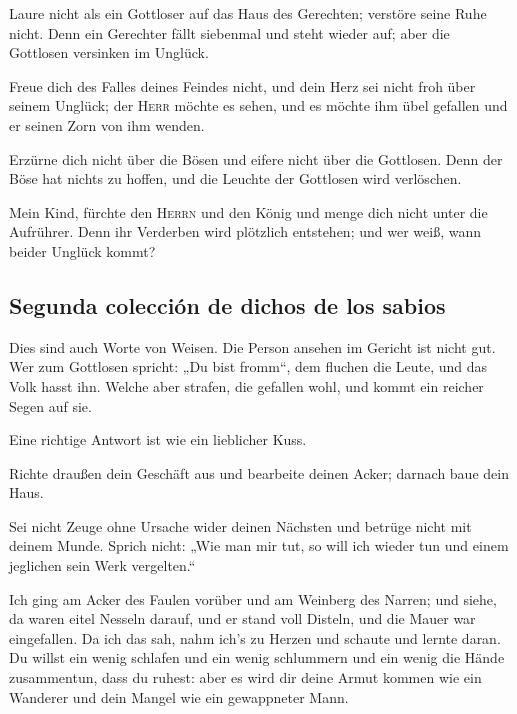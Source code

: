  Laure nicht als ein Gottloser auf das Haus des
Gerechten; verstöre seine Ruhe nicht.  Denn ein Gerechter
fällt siebenmal und steht wieder auf; aber die Gottlosen versinken im
Unglück.

 Freue dich des Falles deines Feindes nicht, und dein
Herz sei nicht froh über seinem Unglück;  der
\textsc{Herr} möchte es sehen, und es möchte ihm übel gefallen und er
seinen Zorn von ihm wenden.

 Erzürne dich nicht über die Bösen und eifere nicht über
die Gottlosen.  Denn der Böse hat nichts zu hoffen, und
die Leuchte der Gottlosen wird verlöschen.

 Mein Kind, fürchte den \textsc{Herrn} und den König und
menge dich nicht unter die Aufrührer.  Denn ihr Verderben
wird plötzlich entstehen; und wer weiß, wann beider Unglück kommt?

\hypertarget{segunda-colecciuxf3n-de-dichos-de-los-sabios}{%
\subsection{Segunda colección de dichos de los
sabios}\label{segunda-colecciuxf3n-de-dichos-de-los-sabios}}

 Dies sind auch Worte von Weisen. Die Person ansehen im
Gericht ist nicht gut.  Wer zum Gottlosen spricht: „Du
bist fromm``, dem fluchen die Leute, und das Volk hasst ihn.
 Welche aber strafen, die gefallen wohl, und kommt ein
reicher Segen auf sie.

 Eine richtige Antwort ist wie ein lieblicher Kuss.

 Richte draußen dein Geschäft aus und bearbeite deinen
Acker; darnach baue dein Haus.

 Sei nicht Zeuge ohne Ursache wider deinen Nächsten und
betrüge nicht mit deinem Munde.  Sprich nicht: „Wie man
mir tut, so will ich wieder tun und einem jeglichen sein Werk
vergelten.``

 Ich ging am Acker des Faulen vorüber und am Weinberg des
Narren;  und siehe, da waren eitel Nesseln darauf, und er
stand voll Disteln, und die Mauer war eingefallen.  Da
ich das sah, nahm ich's zu Herzen und schaute und lernte daran.
 Du willst ein wenig schlafen und ein wenig schlummern
und ein wenig die Hände zusammentun, dass du ruhest: 
aber es wird dir deine Armut kommen wie ein Wanderer und dein Mangel wie
ein gewappneter Mann.

